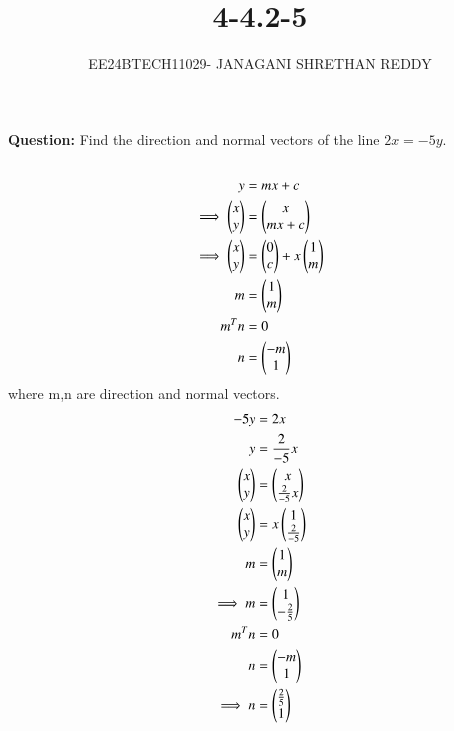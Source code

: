 \documentclass[journal]{IEEEtran}
\begin{document}
 

\vspace{3cm}

\title{4-4.2-5}
\author{EE24BTECH11029- JANAGANI SHRETHAN REDDY}
\maketitle
\bigskip
\renewcommand{\thefigure}{\theenumi}
\renewcommand{\thetable}{\theenumi}
\textbf{Question:}
Find the direction and normal vectors of the line $2x=-5y$.\\
\solution\\
\begin{align}
    y&=mx+c\\
   \implies\begin{pmatrix}x\\y\end{pmatrix}&=\begin{pmatrix}x\\mx+c\end{pmatrix}\\
    \implies\begin{pmatrix}x\\y\end{pmatrix}&=\begin{pmatrix}0\\c\end{pmatrix}+x\begin{pmatrix}1\\m\end{pmatrix}\\
    m&=\begin{pmatrix}1\\m\end{pmatrix}\\
    m^Tn&=0\\
    n&=\begin{pmatrix}-m\\1\end{pmatrix}
\end{align}
where m,n are direction and normal vectors.
\begin{align}
    -5y&=2x\\
    y&=\frac{2}{-5}x\\
    \begin{pmatrix}x\\y\end{pmatrix}&=\begin{pmatrix}x\\ \frac{2}{-5}x\end{pmatrix}\\
    \begin{pmatrix}x\\y\end{pmatrix}&=x\begin{pmatrix}1\\ \frac{2}{-5}\end{pmatrix}\\
    m&=\begin{pmatrix}1\\m\end{pmatrix}\\
    \implies m&=\begin{pmatrix}1\\ -\frac{2}{5}\end{pmatrix}\\
    m^Tn&=0\\
    n&=\begin{pmatrix}-m\\1\end{pmatrix}\\
  \implies  n&=\begin{pmatrix}\frac{2}{5}\\1\end{pmatrix}
\end{align}
\end{document}
